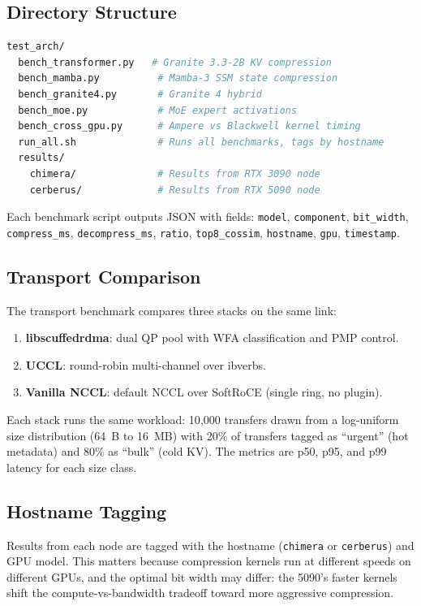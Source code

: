 \documentclass[11pt,letterpaper]{article}
\begin{document}
\subsection{Directory Structure}

\begin{lstlisting}[language=bash, caption={Benchmark directory layout.}]
test_arch/
  bench_transformer.py   # Granite 3.3-2B KV compression
  bench_mamba.py          # Mamba-3 SSM state compression
  bench_granite4.py       # Granite 4 hybrid
  bench_moe.py            # MoE expert activations
  bench_cross_gpu.py      # Ampere vs Blackwell kernel timing
  run_all.sh              # Runs all benchmarks, tags by hostname
  results/
    chimera/              # Results from RTX 3090 node
    cerberus/             # Results from RTX 5090 node
\end{lstlisting}

Each benchmark script outputs JSON with fields: \texttt{model}, \texttt{component}, \texttt{bit\_width}, \texttt{compress\_ms}, \texttt{decompress\_ms}, \texttt{ratio}, \texttt{top8\_cossim}, \texttt{hostname}, \texttt{gpu}, \texttt{timestamp}.

\subsection{Transport Comparison}

The transport benchmark compares three stacks on the same link:

\begin{enumerate}
\item \textbf{libscuffedrdma}: dual QP pool with WFA classification and PMP control.
\item \textbf{UCCL}: round-robin multi-channel over ibverbs.
\item \textbf{Vanilla NCCL}: default NCCL over SoftRoCE (single ring, no plugin).
\end{enumerate}

Each stack runs the same workload: 10{,}000 transfers drawn from a log-uniform size distribution (64~B to 16~MB) with 20\% of transfers tagged as ``urgent'' (hot metadata) and 80\% as ``bulk'' (cold KV). The metrics are p50, p95, and p99 latency for each size class.

\subsection{Hostname Tagging}

Results from each node are tagged with the hostname (\texttt{chimera} or \texttt{cerberus}) and GPU model. This matters because compression kernels run at different speeds on different GPUs, and the optimal bit width may differ: the 5090's faster kernels shift the compute-vs-bandwidth tradeoff toward more aggressive compression.
\end{document}
